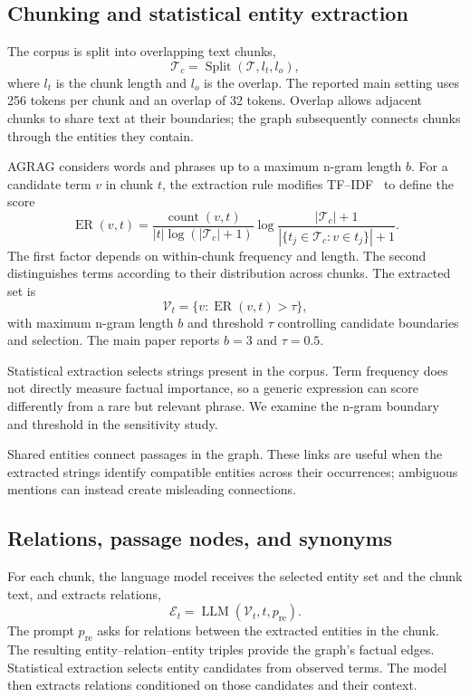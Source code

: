 \subsection{Chunking and statistical entity extraction}
The corpus is split into overlapping text chunks,
\begin{equation}
\mathcal{T}_c=\operatorname{Split}(\mathcal{T},l_t,l_o),
\label{eq:agrag:chunking}
\end{equation}
where $l_t$ is the chunk length and $l_o$ is the overlap. The reported main setting uses 256 tokens per chunk and an overlap of 32 tokens. Overlap allows adjacent chunks to share text at their boundaries; the graph subsequently connects chunks through the entities they contain.

AGRAG considers words and phrases up to a maximum n-gram length $b$. For a candidate term $v$ in chunk $t$, the extraction rule modifies TF--IDF~\cite{agrag-tfidf} to define the score
\begin{equation}
\operatorname{ER}(v,t)=
\frac{\operatorname{count}(v,t)}{|t|\log(|\mathcal{T}_c|+1)}
\log\frac{|\mathcal{T}_c|+1}{|\{t_j\in\mathcal{T}_c:v\in t_j\}|+1}.
\label{eq:agrag:extraction-score}
\end{equation}
The first factor depends on within-chunk frequency and length. The second distinguishes terms according to their distribution across chunks. The extracted set is
\begin{equation}
\mathcal{V}_t=\{v:\operatorname{ER}(v,t)>\tau\},
\label{eq:agrag:entities}
\end{equation}
with maximum n-gram length $b$ and threshold $\tau$ controlling candidate boundaries and selection. The main paper reports $b=3$ and $\tau=0.5$.

Statistical extraction selects strings present in the corpus. Term frequency does not directly measure factual importance, so a generic expression can score differently from a rare but relevant phrase. We examine the n-gram boundary and threshold in the sensitivity study.

Shared entities connect passages in the graph. These links are useful when the extracted strings identify compatible entities across their occurrences; ambiguous mentions can instead create misleading connections.

\subsection{Relations, passage nodes, and synonyms}
For each chunk, the language model receives the selected entity set and the chunk text, and extracts relations,
\begin{equation}
\mathcal{E}_t=\operatorname{LLM}(\mathcal{V}_t,t,p_{\mathrm{re}}).
\label{eq:agrag:relations}
\end{equation}
The prompt $p_{\mathrm{re}}$ asks for relations between the extracted entities in the chunk. The resulting entity--relation--entity triples provide the graph's factual edges. Statistical extraction selects entity candidates from observed terms. The model then extracts relations conditioned on those candidates and their context.

